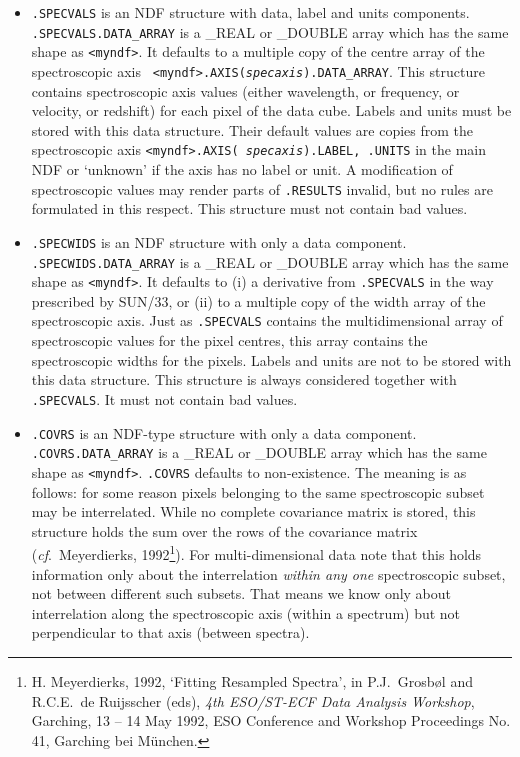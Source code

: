 \documentclass[11pt,twoside]{article}
\newcommand{\xref}[3]{#1}
\begin{document}
\begin{itemize}
\item{\tt .SPECVALS} is an NDF structure with data, label and units
   components. {\tt .SPECVALS.\-DATA\_\-ARRAY} is a \_REAL or \_DOUBLE
   array which has the same shape as {\tt <myndf>}. It defaults to a
   multiple copy of the centre array of the spectroscopic axis {\tt
   <myndf>.AXIS\-({\it specaxis})\-.DATA\_\-ARRAY}. This structure
   contains spectroscopic axis values (either wavelength, or frequency,
   or velocity, or redshift) for each pixel of the data cube. Labels and
   units must be stored with this data structure. Their default values
   are copies from the spectroscopic axis {\tt <myndf>.AXIS({\it
   specaxis}).LABEL, .UNITS} in the main NDF or `unknown' if the axis
   has no label or unit. A modification of spectroscopic values may
   render parts of {\tt .RESULTS} invalid, but no rules are formulated
   in this respect. This structure must not contain bad values.

\item{\tt .SPECWIDS} is an NDF structure with only a data component.
   {\tt .SPECWIDS.DATA\_\-ARRAY} is a \_REAL or \_DOUBLE array which has
   the same shape as {\tt <myndf>}. It defaults to (i) a derivative from
   {\tt .SPECVALS} in the way prescribed by
\xref{SUN/33}{sun33}{axis_components},
   or (ii) to a multiple copy of the width array of the spectroscopic
   axis. Just as {\tt .SPECVALS} contains the multidimensional array of
   spectroscopic values for the pixel centres, this array contains the
   spectroscopic widths for the pixels. Labels and units are not to be
   stored with this data structure. This structure is always considered
   together with {\tt .SPECVALS}. It must not contain bad values.

\item{\tt .COVRS} is an NDF-type structure with only a data component.
   {\tt .COVRS.DATA\_ARRAY} is a \_REAL or \_DOUBLE array which has the
   same shape as {\tt <myndf>}. {\tt .COVRS} defaults to
   non-existence. The meaning is as follows: for some reason pixels
   belonging to the same spectroscopic subset may be interrelated. While
   no complete covariance matrix is stored, this structure holds the sum
   over the rows of the covariance matrix ({\it cf}.\ Meyerdierks,
   1992\footnote{H. Meyerdierks, 1992, `Fitting Resampled Spectra', in
   P.J.\ Grosb\o l and R.C.E.\ de Ruijsscher (eds), {\it 4th ESO/ST-ECF
   Data Analysis Workshop}, Garching, 13 -- 14 May 1992, ESO Conference
   and Workshop Proceedings No. 41, Garching bei M\"unchen.}). For
   multi-dimensional data note that this holds information only about
   the interrelation {\it within any one} spectroscopic subset, not
   between different such subsets. That means we know only about
   interrelation along the spectroscopic axis (within a spectrum) but
   not perpendicular to that axis (between spectra).


\end{itemize}
\end{document}
